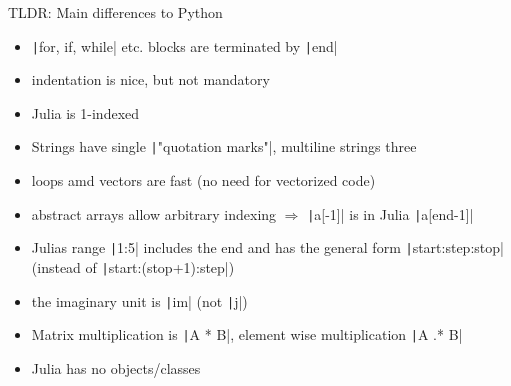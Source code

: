 \documentclass[aspectratio=169, 11pt, handout]{beamer}
\begin{document}
    \begin{frame}[fragile]{TLDR: Main differences to Python}
        \begin{itemize}
            \item \texttt|for, if, while| etc. blocks are terminated by  \texttt|end|
            \item indentation is nice, but not mandatory
            \item \alert{Julia is 1-indexed}
            \item Strings have single \texttt|"quotation marks"|, multiline strings three
            \pause
            \item loops amd vectors are fast (no need for vectorized code)
            \item abstract arrays allow arbitrary indexing $\Rightarrow$ \texttt|a[-1]| is in Julia \texttt|a[end-1]|
            \item Julias range \texttt|1:5| includes the end and has the general form \texttt|start:step:stop| (instead of \texttt|start:(stop+1):step|)
            \item the imaginary unit is \texttt|im| (not \texttt|j|)
            \pause
            \item Matrix multiplication is \texttt|A * B|, element wise multiplication \texttt|A .* B|
            \item Julia has no objects/classes
        \end{itemize}
    \end{frame}
\end{document}
